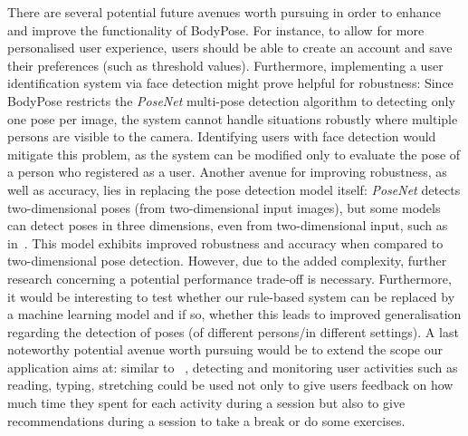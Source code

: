 There are several potential future avenues worth pursuing in order to enhance and improve the functionality of BodyPose. For instance, to allow for more personalised user experience, users should be able to create an account and save their preferences (such as threshold values). Furthermore, implementing a user identification system via face detection might prove helpful for robustness: Since BodyPose restricts the \textit{PoseNet} multi-pose detection algorithm to detecting only one pose per image, the system cannot handle situations robustly where multiple persons are visible to the camera. Identifying users with face detection would mitigate this problem, as the system can be modified only to evaluate the pose of a person who registered as a user. Another avenue for improving robustness, as well as accuracy, lies in replacing the pose detection model itself: \textit{PoseNet} detects two-dimensional poses (from two-dimensional input images), but some models can detect poses in three dimensions, even from two-dimensional input, such as in~\cite{Arnab_2019}. This model exhibits improved robustness and accuracy when compared to two-dimensional pose detection. However, due to the added complexity, further research concerning a potential performance trade-off is necessary. Furthermore, it would be interesting to test whether our rule-based system can be replaced by a machine learning model and if so, whether this leads to improved generalisation regarding the detection of poses (of different persons/in different settings). A last noteworthy potential avenue worth pursuing would be to extend the scope our application aims at: similar to ~\cite{jaimes2005sit}, detecting and monitoring user activities such as reading, typing, stretching could be used not only to give users feedback on how much time they spent for each activity during a session but also to give recommendations during a session to take a break or do some exercises.


